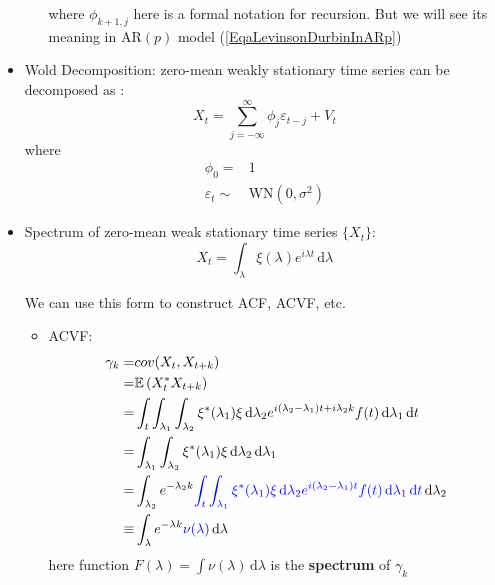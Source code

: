 \begin{itemize}[topsep=2pt,itemsep=0pt]
\begin{itemize}[topsep=2pt,itemsep=0pt]
        where $ \phi _{k+1,j} $ here is a formal notation for recursion. But we will see its meaning in AR$ (p) $ model (\autoref{EqaLevinsonDurbinInARp})
        
        
    \end{itemize}
        
            
    

        \item Wold Decomposition: zero-mean weakly stationary time series can be decomposed as :
        \begin{equation}
            X_t=\sum_{j=-\infty}^\infty \phi _j\varepsilon _{t-j}+V_t 
        \end{equation}
        where
        \begin{align*}
            \phi _0=&1\\
            \varepsilon _t\sim &\mathrm{WN}(0,\sigma ^2) 
        \end{align*}


        \item Spectrum of zero-mean weak stationary time series $ \{X_t\} $:
        \begin{equation}
            X_t=\int _\lambda \xi (\lambda )e^{i\lambda t} \,\mathrm{d}\lambda 
        \end{equation}

        We can use this form to construct ACF, ACVF, etc.
        \begin{itemize}[topsep=2pt,itemsep=0pt]
            \item ACVF:
            \begin{align*}
                \gamma _k=&cov(X_t,X_{t+k})\\
                =&\mathbb{E}\left( X_t^*X_{t+k} \right)\\
                =&\int _{t}\int _{\lambda _1}\int _{\lambda _2} \xi ^*(\lambda _1)\xi  \,\mathrm{d}\lambda _2 e^{i(\lambda _2-\lambda _1)t+i\lambda _2k} f(t) \,\mathrm{d}\lambda _1 \,\mathrm{d}t \\
                =&\int _{\lambda _1}\int _{\lambda _2} \xi ^*(\lambda _1)\xi  \,\mathrm{d}\lambda _2  \,\mathrm{d}\lambda _1 \\
                =&\int _{\lambda _2}e^{-\lambda _2k} {\color{blue} \int _t\int _{\lambda_1} \xi ^*(\lambda _1)\xi  \,\mathrm{d}\lambda _2 e^{i(\lambda _2-\lambda _1)t} f(t) \,\mathrm{d}\lambda _1 \,\mathrm{d}t }  \,\mathrm{d}\lambda _2\\
                \equiv&\int _{\lambda } e^{-\lambda k}{\color{blue}\nu (\lambda )}  \,\mathrm{d}\lambda 
            \end{align*}
            here function $ F(\lambda )=\int \nu (\lambda ) \,\mathrm{d}\lambda  $ is the \textbf{spectrum} of $ \gamma _k $ 


\end{itemize}
\end{itemize}
